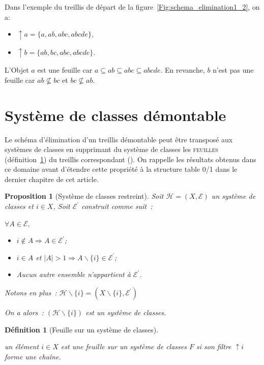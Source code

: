 \documentclass[a4paper]{report}
\newtheorem{definition}{Définition}[chapter]
\newtheorem{proposition}{Proposition}[chapter]
\begin{document}
Dans l'exemple du treillis de départ de la figure~\ref{Fig:schema_elimination1_2}, on a:
\begin{itemize}
\item $\uparrow a =\{a, ab, abc, abcde \}$,
\item $\uparrow b =\{ab, bc, abc, abcde \}$. 
\end{itemize}

L'Objet $a$ est une feuille car $a \subseteq ab \subseteq abc \subseteq abcde$. En revanche, 
$b$ n'est pas une feuille car $ab  \not\subseteq  bc$ et  $bc  \not\subseteq ab$.
 

\section{Système de classes démontable}

\label{sysd}

Le schéma d'élimination d'un treillis démontable peut \^etre transposé
aux systèmes de classes en supprimant du système de classes les \textsc{feuilles} (défini\-tion~\ref{feuillesys}) du treillis correspondant (\cite{par_clu}).
On rappelle les résultats obtenus dans ce domaine avant d'étendre cette propriété à la structure table 0/1 dans le dernier chapitre de  cet article.

\begin{proposition}[Système de classes restreint]

Soit $\mathcal{H} = (X, \mathcal{E})$ un sys\-tème de classes et $i \in X$,
Soit $\mathcal{E}^{'}$ construit comme suit~:

$\forall A \in \mathcal{E},$
\begin{itemize}
 \item $i \notin A \Rightarrow A \in \mathcal{E}^{'}$;
 \item $i \in A$ et $|A| > 1  \Rightarrow A \backslash \{i\}  \in \mathcal{E}^{'}$;
 \item Aucun autre ensemble n'appartient à $\mathcal{E}^{'}$.
\end{itemize}

Notons en plus~: $\mathcal{H} \backslash \{i\} = (X \backslash \{i\} , \mathcal{E}^{'})$

On a alors~: 
$(\mathcal{H} \backslash \{i\})$ est un système de classes.

\end{proposition}

\begin{definition}[Feuille sur un système de classes]

\label{feuillesys}

un élément $i \in X$ est une feuille sur un système de classes $F$ si son filtre  $\uparrow i$ forme une cha\^ine.
\end{definition}
\end{document}
